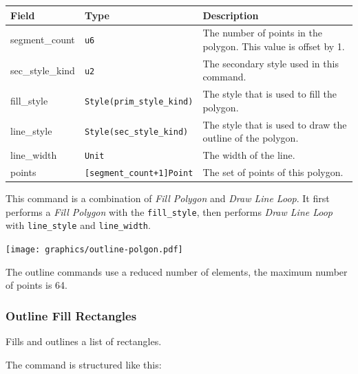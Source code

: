 \documentclass[]{article}
\begin{document}
\begin{longtable}[]{@{}p{1in}p{2in}p{3in}@{}}
\toprule
Field & Type & Description \\
\midrule
\endhead
segment\_count   & \texttt{u6}                          & The number of points in the polygon. This value is offset by 1. \\
sec\_style\_kind & \texttt{u2}                          & The secondary style used in this command. \\
fill\_style      & \texttt{Style(prim\_style\_kind)}    & The style that is used to fill the polygon. \\
line\_style      & \texttt{Style(sec\_style\_kind)}     & The style that is used to draw the outline of the polygon. \\
line\_width      & \texttt{Unit}                        & The width of the line. \\
points           & \texttt{{[}segment\_count+1{]}Point} & The set of points of this polygon. \\
\bottomrule
\end{longtable}

This command is a combination of \emph{Fill Polygon} and \emph{Draw Line Loop}. It first performs a \emph{Fill Polygon} with the \texttt{fill\_style}, then performs \emph{Draw Line Loop} with \texttt{line\_style} and \texttt{line\_width}.

\begin{center}
\texttt{[image: graphics/outline-polgon.pdf]}
\end{center}

The outline commands use a reduced number of elements, the maximum
number of points is 64.

\hypertarget{outline-fill-rectangles}{\subsubsection{Outline Fill Rectangles}\label{outline-fill-rectangles}}

Fills and outlines a list of rectangles.

The command is structured like this:
\end{document}
